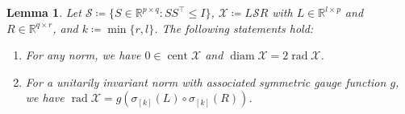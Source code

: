 \documentclass[pdflatex,sn-mathphys-num]{sn-jnl}%
\DeclareMathOperator{\rad}{rad}
\DeclareMathOperator{\cent}{cent}
\DeclareMathOperator{\diam}{diam}
\theoremstyle{thmstyleone}
\newtheorem{lemma}[theorem]{Lemma}
\begin{document}
\begin{lemma}
\label{lem:cheball}
Let $\mathcal{S}\coloneqq \{S\in\mathbb{R}^{p\times q}:SS^\top\leq I\}$, $\mathcal{X}\coloneqq L\mathcal{S}R$ with $L\in\mathbb{R}^{l\times p}$ and $R\in\mathbb{R}^{q\times r}$, and $k\coloneqq\min \{r,l\}$. The following statements hold: 
\begin{enumerate}[label=\normalfont{(\alph*)},ref=\ref{lem:cheball}(\alph*)]
    \item\label{lem:cheball-c} For any norm, we have $0\in\cent\mathcal{X}$ and $\diam\mathcal{X}=2\rad\mathcal{X}$.
    \item\label{lem:cheball-a} For a unitarily invariant norm with associated symmetric gauge function $g$, we have $\rad\mathcal{X}=g(\sigma_{[k]}(L)\circ \sigma_{[k]}(R))$.
\end{enumerate}
\end{lemma}
\end{document}
